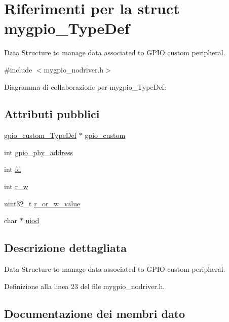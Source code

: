 \hypertarget{structmygpio___type_def}{}\section{Riferimenti per la struct mygpio\+\_\+\+Type\+Def}
\label{structmygpio___type_def}


Data Structure to manage data associated to G\+P\+IO custom peripheral.  




{\ttfamily \#include $<$mygpio\+\_\+nodriver.\+h$>$}



Diagramma di collaborazione per mygpio\+\_\+\+Type\+Def\+:
\subsection*{Attributi pubblici}
\begin{DoxyCompactItemize}
\item 
\hyperlink{structgpio__custom___type_def}{gpio\+\_\+custom\+\_\+\+Type\+Def} $\ast$ \hyperlink{structmygpio___type_def_a1e4038eb57b6ccd8d94a4f0258961f97}{gpio\+\_\+custom}
\item 
int \hyperlink{structmygpio___type_def_a3e193df18cdd2d05417e18a99c876cc9}{gpio\+\_\+phy\+\_\+address}
\item 
int \hyperlink{structmygpio___type_def_a7dca4ba0fccbbc45369cf551d3688849}{fd}
\item 
int \hyperlink{structmygpio___type_def_ad380cd40cc8cd86e745f5f14eca7cb44}{r\+\_\+w}
\item 
uint32\+\_\+t \hyperlink{structmygpio___type_def_aab3573a0ca458b76823e4f573eddff10}{r\+\_\+or\+\_\+w\+\_\+value}
\item 
char $\ast$ \hyperlink{structmygpio___type_def_a40667a00b61db1a77198255f02f25fe9}{uiod}
\end{DoxyCompactItemize}


\subsection{Descrizione dettagliata}
Data Structure to manage data associated to G\+P\+IO custom peripheral. 

Definizione alla linea 23 del file mygpio\+\_\+nodriver.\+h.



\subsection{Documentazione dei membri dato}
\mbox{\label{structmygpio___type_def_a7dca4ba0fccbbc45369cf551d3688849}} 
